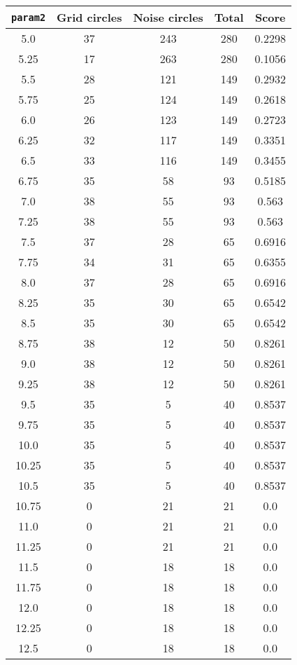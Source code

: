 \documentclass[letterpaper, 12pt]{article}
\begin{document}
\begin{longtable}{|c|c|c|c|c|}
\hline
\textbf{\texttt{param2}} & \textbf{Grid circles} & \textbf{Noise circles} & \textbf{Total} & \textbf{Score} \\
\hline
5.0 & 37 & 243 & 280 & 0.2298 \\
\hline
5.25 & 17 & 263 & 280 & 0.1056 \\
\hline
5.5 & 28 & 121 & 149 & 0.2932 \\
\hline
5.75 & 25 & 124 & 149 & 0.2618 \\
\hline
6.0 & 26 & 123 & 149 & 0.2723 \\
\hline
6.25 & 32 & 117 & 149 & 0.3351 \\
\hline
6.5 & 33 & 116 & 149 & 0.3455 \\
\hline
6.75 & 35 & 58 & 93 & 0.5185 \\
\hline
7.0 & 38 & 55 & 93 & 0.563 \\
\hline
7.25 & 38 & 55 & 93 & 0.563 \\
\hline
7.5 & 37 & 28 & 65 & 0.6916 \\
\hline
7.75 & 34 & 31 & 65 & 0.6355 \\
\hline
8.0 & 37 & 28 & 65 & 0.6916 \\
\hline
8.25 & 35 & 30 & 65 & 0.6542 \\
\hline
8.5 & 35 & 30 & 65 & 0.6542 \\
\hline
8.75 & 38 & 12 & 50 & 0.8261 \\
\hline
9.0 & 38 & 12 & 50 & 0.8261 \\
\hline
9.25 & 38 & 12 & 50 & 0.8261 \\
\hline
9.5 & 35 & 5 & 40 & 0.8537 \\
\hline
9.75 & 35 & 5 & 40 & 0.8537 \\
\hline
10.0 & 35 & 5 & 40 & 0.8537 \\
\hline
10.25 & 35 & 5 & 40 & 0.8537 \\
\hline
10.5 & 35 & 5 & 40 & 0.8537 \\
\hline
10.75 & 0 & 21 & 21 & 0.0 \\
\hline
11.0 & 0 & 21 & 21 & 0.0 \\
\hline
11.25 & 0 & 21 & 21 & 0.0 \\
\hline
11.5 & 0 & 18 & 18 & 0.0 \\
\hline
11.75 & 0 & 18 & 18 & 0.0 \\
\hline
12.0 & 0 & 18 & 18 & 0.0 \\
\hline
12.25 & 0 & 18 & 18 & 0.0 \\
\hline
12.5 & 0 & 18 & 18 & 0.0 \\

\end{longtable}
\end{document}
